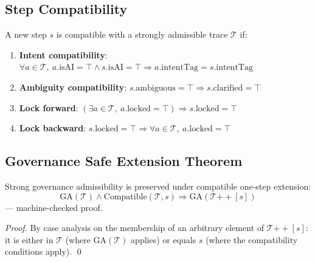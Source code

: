 \subsection{Step Compatibility}

\begin{definition}
A new step $s$ is compatible with a strongly admissible trace $\mathcal{T}$ if:
\begin{enumerate}
  \item \textbf{Intent compatibility}:
        $\forall a \in \mathcal{T},\ a.\mathrm{isAI} = \top \wedge
        s.\mathrm{isAI} = \top \Rightarrow
        a.\mathrm{intentTag} = s.\mathrm{intentTag}$
  \item \textbf{Ambiguity compatibility}:
        $s.\mathrm{ambiguous} = \top \Rightarrow s.\mathrm{clarified} = \top$
  \item \textbf{Lock forward}:
        $(\exists a \in \mathcal{T},\ a.\mathrm{locked} = \top)
        \Rightarrow s.\mathrm{locked} = \top$
  \item \textbf{Lock backward}:
        $s.\mathrm{locked} = \top \Rightarrow
        \forall a \in \mathcal{T},\ a.\mathrm{locked} = \top$
\end{enumerate}
\end{definition}

\subsection{Governance Safe Extension Theorem}

\begin{theorem}
Strong governance admissibility is preserved under compatible one-step extension:
\[
  \mathrm{GA}(\mathcal{T}) \wedge \mathrm{Compatible}(\mathcal{T}, s)
  \Rightarrow
  \mathrm{GA}(\mathcal{T} \mathbin{+\!\!+} [s])
\]
--- machine-checked proof.
\end{theorem}
\begin{proof}
By case analysis on the membership of an arbitrary element of
$\mathcal{T} \mathbin{+\!\!+} [s]$: it is either in $\mathcal{T}$ (where
$\mathrm{GA}(\mathcal{T})$ applies) or equals $s$ (where the compatibility
conditions apply). \qed
\end{proof}

